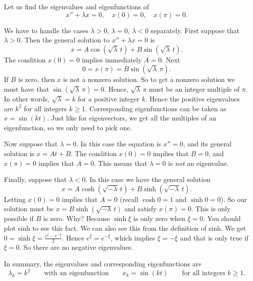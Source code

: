 \documentclass[12pt]{book}
\begin{document}
\begin{example} \label{bvp:eig1ex}
Let us find the eigenvalues and eigenfunctions of
\begin{equation*}
x'' + \lambda x = 0, \quad x(0) = 0, \quad x(\pi) = 0 .
\end{equation*}

We have to handle
the cases $\lambda > 0$, $\lambda = 0$, $\lambda < 0$ separately.
First suppose that $\lambda > 0$.  Then
the general solution to $x''+\lambda x = 0$ is
\begin{equation*}
x = A \cos (\! \sqrt{\lambda}\, t) + B \sin (\! \sqrt{\lambda}\, t).
\end{equation*}
The condition $x(0) = 0$ implies immediately $A = 0$.
Next
\begin{equation*}
0 = x(\pi) = B \sin (\! \sqrt{\lambda}\, \pi ) .
\end{equation*}
If $B$ is zero, then $x$ is not a nonzero solution.  So to get a nonzero
solution we must have that $\sin (\! \sqrt{\lambda}\, \pi) = 0$.  Hence,
$\sqrt{\lambda}\, \pi$ must be an integer multiple of $\pi$.  In other words,
 $\sqrt{\lambda} = k$ for a positive integer $k$.
Hence the positive eigenvalues are
$k^2$ for all integers $k \geq 1$.  Corresponding eigenfunctions
can be taken as $x=\sin (k t)$.  Just like for eigenvectors, we get all the
multiples of an eigenfunction, so we only need to pick one.

Now suppose that $\lambda = 0$.  In this case the equation is $x'' = 0$,
and its general solution is $x = At + B$.  The condition $x(0) = 0$ implies
that $B=0$, and $x(\pi) = 0$ implies that $A = 0$.  This means that $\lambda
= 0$ is \emph{not} an eigenvalue.

Finally, suppose that $\lambda < 0$.  In this case we have the general solution
\begin{equation*}
x = A \cosh (\! \sqrt{-\lambda}\, t) + B \sinh (\! \sqrt{-\lambda}\, t ) .
\end{equation*}
Letting $x(0) = 0$ implies that $A = 0$ (recall $\cosh 0 = 1$ and $\sinh 0 =
0$).  So our solution must be $x = B \sinh (\! \sqrt{-\lambda}\, t )$ and satisfy
$x(\pi) = 0$.  This is only possible if $B$ is zero.  Why?  Because
$\sinh \xi$ is only zero when $\xi=0$.  You should plot sinh to see this
fact.
We can also see this from the definition of sinh.
We get $0 = \sinh \xi = \frac{e^\xi -
e^{-\xi}}{2}$.  Hence $e^\xi = e^{-\xi}$, which implies $\xi = -\xi$ and that is only
true if $\xi=0$.  So there are no negative eigenvalues.

In summary, the eigenvalues and corresponding eigenfunctions are
\begin{equation*}
\lambda_k = k^2 \qquad \text{with an eigenfunction} \qquad x_k = \sin (k t)
\qquad \text{for all integers } k \geq 1 .
\end{equation*}
\end{example}
\end{document}
